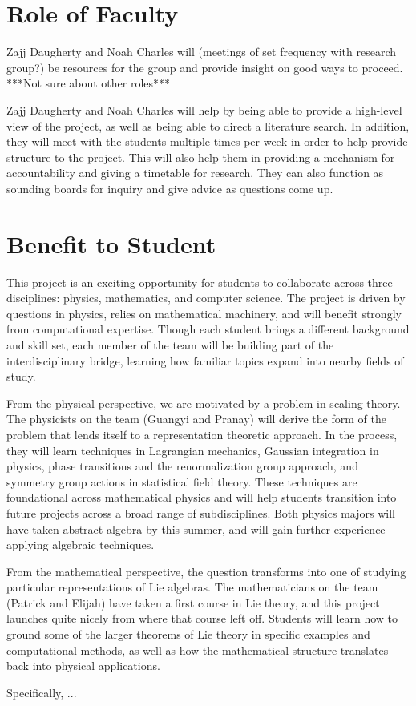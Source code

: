 \documentclass[11pt, reqno]{amsart}
\begin{document}
\section{Role of Faculty}

Zajj Daugherty and Noah Charles will (meetings of set frequency with research group?) be resources for the group and provide insight on good ways to proceed. ***Not sure about other roles***

Zajj Daugherty and Noah Charles will help by being able to provide a high-level view of the project, as well as being able to direct a literature search. In addition, they will meet with the students multiple times per week in order to help provide structure to the project. This will also help them in providing a mechanism for accountability and giving a timetable for research. They can also function as sounding boards for inquiry and give advice as questions come up.

\section{Benefit to Student}

This project is an exciting opportunity for students to collaborate across three disciplines: physics, mathematics, and computer science. The project is driven by questions in physics, relies on mathematical machinery, and will benefit strongly from computational expertise. Though each student brings a different background and skill set, each member of the team will be building part of the interdisciplinary bridge, learning how familiar topics expand into nearby fields of study. 

From the physical perspective, we are motivated by a problem in scaling theory. The physicists on the team (Guangyi and Pranay) will derive the form of the problem that lends itself to a representation theoretic approach. In the process, they will learn techniques in Lagrangian mechanics, Gaussian integration in physics, phase transitions and the renormalization group approach, and symmetry group actions in statistical field theory. These techniques are foundational across mathematical physics and will help students transition into future projects across a broad range of subdisciplines. Both physics majors will have taken abstract algebra by this summer, and will gain further experience applying algebraic techniques.

From the mathematical perspective, the question transforms into one of studying particular representations of Lie algebras. The mathematicians on the team (Patrick and Elijah) have taken a first course in Lie theory, and this project launches quite nicely from where that course left off. Students will learn how to ground some of the larger theorems of Lie theory in specific examples and computational methods, as well as how the mathematical structure translates back into physical applications. 

Specifically, ...
\printbibliography
\end{document}
